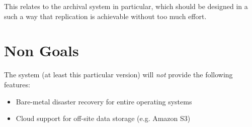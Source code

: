 This relates to the archival system in particular, which should be designed in
a such a way that replication is achievable without too much effort.

\section{Non Goals}

The system (at least this particular version) will \emph{not} provide the
following features:

\begin{itemize}
    \item Bare-metal disaster recovery for entire operating systems
    \item Cloud support for off-site data storage (e.g. Amazon S3)
\end{itemize}
